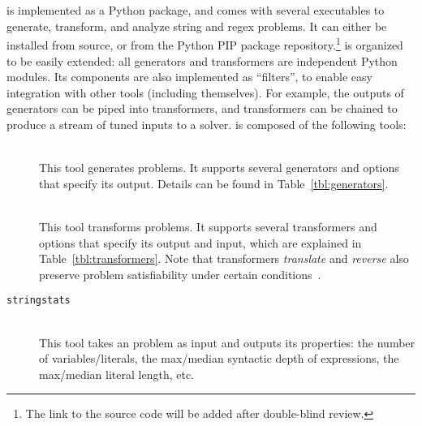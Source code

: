 \section{\fuzzer{}}
\label{sec:fuzzer}

\fuzzer{} is implemented as a Python package, and comes with several
executables to generate, transform, and analyze \smtfull{} string and regex
problems. It can either be installed from source, or from the Python
PIP package repository.\footnote{The link to the
source code will be added after double-blind review.}
\fuzzer{} is organized to be easily extended:
all generators and transformers are independent Python modules. Its
components are also implemented as \unix{} ``filters'', to enable easy
integration with other tools (including themselves). For example, the
outputs of generators can be piped into transformers, and transformers
can be chained to produce a stream of tuned inputs to a
solver. \fuzzer{} is composed of the following tools:
\begin{description}
    \item[\generator{}] \hfill \\
        This tool generates \smt{} problems. It supports several generators and
        options that specify its output. Details can be found in
        Table~\ref{tbl:generators}.
    \item[\transformer{}] \hfill \\
        This tool transforms \smt{}
        problems. It supports several transformers and options that specify
        its output and input, which are explained in
        Table~\ref{tbl:transformers}. Note that transformers
        \textit{translate} and \textit{reverse} also preserve problem
        satisfiability under certain conditions~\cite{ifaz}.
    \item[\texttt{stringstats}] \hfill \\
        This tool takes an \smt{}
        problem as input and outputs its properties: the number of
        variables/literals, the max/median syntactic depth of expressions, the
        max/median literal length, etc.
\end{description}

